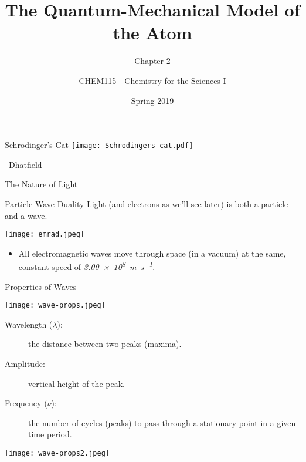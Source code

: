 \documentclass[notes]{beamer}
\title{The Quantum-Mechanical Model of the Atom}
\subtitle{Chapter 2}
\institute[CHEM115 Bloomsburg University]{CHEM115 --- Chemistry for the Sciences I \\ Bloomsburg University}
\author{CHEM115 - Chemistry for the Sciences I}
\date{Spring 2019}
\begin{document}
\begin{frame}
	\titlepage
\end{frame}

\begin{frame}{Schrodinger's Cat}
	\centering
	\texttt{[image: Schrodingers-cat.pdf]}

	\footnotesize \ccbysa\ Dhatfield
\end{frame}

\begin{frame}{The Nature of Light}
	\begin{block}{Particle-Wave Duality}
		Light (and electrons as we'll see later) is both a particle and
		a wave.
	\end{block}

	\begin{center}
		\texttt{[image: emrad.jpeg]}
	\end{center}

	\begin{itemize}
		\item All electromagnetic waves move through space (in a vacuum)
			at the same, constant speed of
			\emph{\SI{3.00e8}{\meter\per\second}}.
	\end{itemize}
\end{frame}

\begin{frame}[allowframebreaks]{Properties of Waves}
	\begin{center}
		\texttt{[image: wave-props.jpeg]}
	\end{center}

	\begin{description}
		\item[Wavelength ($\lambda$):] the distance between two peaks
			(maxima).
		\item[Amplitude:] vertical height of the peak.
		\item[Frequency ($\nu$):] the number of cycles (peaks) to pass
			through a stationary point in a given time period.
	\end{description}

	\framebreak

	\begin{center}
		\texttt{[image: wave-props2.jpeg]}
	\end{center}
\end{frame}
\end{document}
